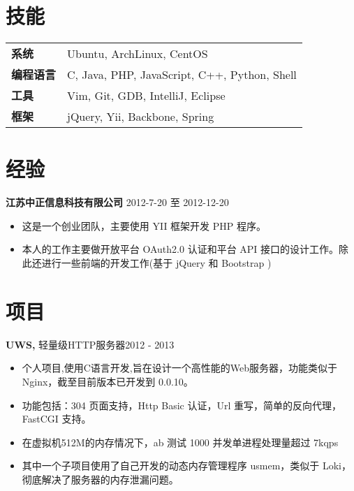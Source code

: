 \documentclass[margin]{res}
\begin{document}
 

\address{ 张启超 \\ }
\address{ 南京大学, 汉口路22号, 210093 \\ (+86) 152-9838-8316  \\ \href{http://lecoding.com}{http://lecoding.com} \\ 
\href{mailto:njuzhangqichao@gmail.com}{njuzhangqichao@gmail.com} }

 
\begin{resume} 
 
\section{技能} 
   \begin{tabular}{l p{3in}}
      \bf{系统} &  Ubuntu, ArchLinux, CentOS \\
      \bf{编程语言} &  C, Java, PHP, JavaScript, C++, Python, Shell \\
      \bf{工具} & Vim, Git, GDB, IntelliJ, Eclipse \\
      \bf{框架} & jQuery, Yii, Backbone, Spring
 \end{tabular}

\section{经验} 
{\bf 江苏中正信息科技有限公司} \hfill 2012-7-20 至 2012-12-20 
\begin{itemize} \itemsep -2pt 
\item 这是一个创业团队，主要使用 YII 框架开发 PHP 程序。
\item 本人的工作主要做开放平台 OAuth2.0 认证和平台 API 接口的设计工作。除此还进行一些前端的开发工作(基于 jQuery 和 Bootstrap )
\end{itemize}

\section{项目}
 {\bf UWS,} 轻量级HTTP服务器\hfill 2012 - 2013
 \begin{itemize} \itemsep -2pt

\item 个人项目,使用C语言开发,旨在设计一个高性能的Web服务器，功能类似于 Nginx，截至目前版本已开发到 0.0.10。
\item 功能包括：304 页面支持，Http Basic 认证，Url 重写，简单的反向代理，FastCGI 支持。
\item 在虚拟机512M的内存情况下，ab 测试 1000 并发单进程处理量超过 7kqps
\item 其中一个子项目使用了自己开发的动态内存管理程序 usmem，类似于 Loki，彻底解决了服务器的内存泄漏问题。
\end{itemize}


\end{resume}
\end{document}
